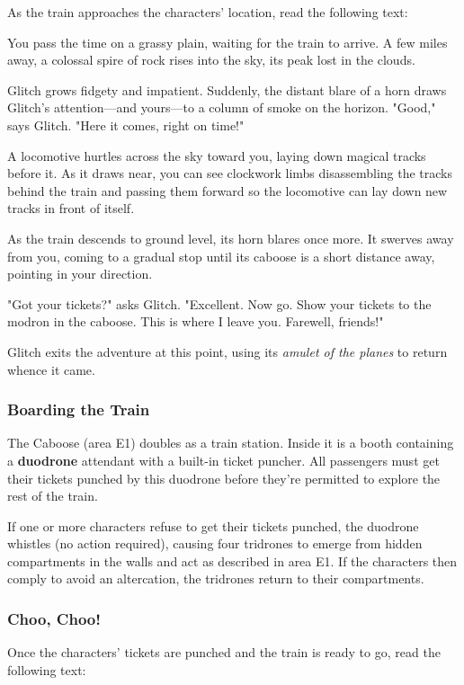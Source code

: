 \documentclass[10pt,a4paper,twoside,bg=print,twocolumn,openany,nodeprecatedcode]{dndbook}
\begin{document}
As the train approaches the characters' location, read the following text:

\begin{DndReadAloud}{}
You pass the time on a grassy plain, waiting for the train to arrive. A few miles away, a colossal spire of rock rises into the sky, its peak lost in the clouds.

Glitch grows fidgety and impatient. Suddenly, the distant blare of a horn draws Glitch's attention—and yours—to a column of smoke on the horizon. "Good," says Glitch. "Here it comes, right on time!"

A locomotive hurtles across the sky toward you, laying down magical tracks before it. As it draws near, you can see clockwork limbs disassembling the tracks behind the train and passing them forward so the locomotive can lay down new tracks in front of itself.

As the train descends to ground level, its horn blares once more. It swerves away from you, coming to a gradual stop until its caboose is a short distance away, pointing in your direction.

"Got your tickets?" asks Glitch. "Excellent. Now go. Show your tickets to the modron in the caboose. This is where I leave you. Farewell, friends!"

\end{DndReadAloud}

Glitch exits the adventure at this point, using its \textit{amulet of the planes} to return whence it came.

\subsubsection{Boarding the Train}
The Caboose (area E1) doubles as a train station. Inside it is a booth containing a \textbf{duodrone} attendant with a built-in ticket puncher. All passengers must get their tickets punched by this duodrone before they're permitted to explore the rest of the train.

If one or more characters refuse to get their tickets punched, the duodrone whistles (no action required), causing four tridrones to emerge from hidden compartments in the walls and act as described in area E1. If the characters then comply to avoid an altercation, the tridrones return to their compartments.

\subsubsection{Choo, Choo!}
Once the characters' tickets are punched and the train is ready to go, read the following text:
\end{document}
